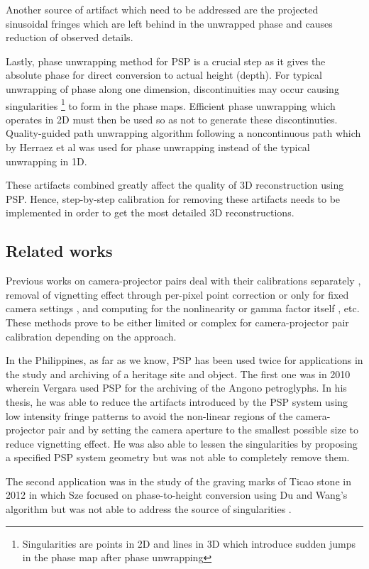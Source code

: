 Another source of artifact which need to be addressed are the projected sinusoidal fringes which are left behind in the unwrapped phase and causes reduction of observed details.

Lastly, phase unwrapping method for PSP is a crucial step as it gives the absolute phase for direct conversion to actual height (depth). For typical unwrapping of phase along one dimension, discontinuities may occur causing singularities \footnote{Singularities are points in 2D and lines in 3D which introduce sudden jumps in the phase map after phase unwrapping} to form in the phase maps.
Efficient phase unwrapping which operates in 2D must then be used so as not to generate these discontinuties. Quality-guided path unwrapping algorithm following a noncontinuous path which by Herraez et al was used for phase unwrapping instead of the typical unwrapping in 1D.

These artifacts combined greatly affect the quality of 3D reconstruction using PSP.
Hence, step-by-step calibration for removing these artifacts needs to be implemented in order to get the most detailed 3D reconstructions. 

\subsection{Related works}

Previous works on camera-projector pairs deal with their calibrations separately \cite{Fernandez2011}, removal of vignetting effect through per-pixel point correction \cite{Yu2004} or only for fixed camera settings \cite{Goldman}, and computing for the nonlinearity or gamma factor itself \cite{Wang2014, Baker2008}, etc. 
These methods prove to be either limited or complex for camera-projector pair calibration depending on the approach.

In the Philippines, as far as we know, PSP has been used twice for applications in the study and archiving of a heritage site and object. 
The first one was in 2010 wherein Vergara used PSP for the archiving of the Angono petroglyphs. 
In his thesis, he was able to reduce the artifacts introduced by the PSP system using low intensity fringe patterns to avoid the non-linear regions of the camera-projector pair and by setting the camera aperture to the smallest possible size to reduce vignetting effect. 
He was also able to lessen the singularities by proposing a specified PSP system geometry but was not able to completely remove them. 

The second application was in the study of the graving marks of Ticao stone in 2012 in which Sze focused on phase-to-height conversion using Du and Wang's algorithm but was not able to address the source of singularities \cite{Sze2012}.

